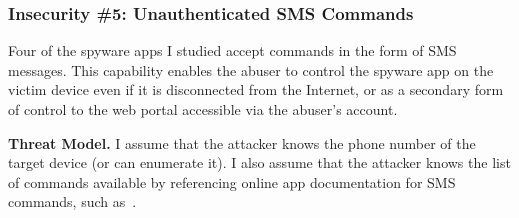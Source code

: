 



\subsubsection*{Insecurity \#5: Unauthenticated SMS Commands}

Four of the spyware apps I studied accept commands in
the form of SMS messages.  This capability enables the abuser to
control the spyware app on the victim device even if it is
disconnected from the Internet, or as a secondary form of control to
the web portal accessible via the abuser's account.

\textbf{Threat Model.} I assume that the attacker knows the phone
number of the target device (or can enumerate it). I also assume that
the attacker knows the list of commands available by referencing online
app documentation for SMS commands, such as~\cite{SpappSMSCommands:online,
  FlexispySMSCommands:online}.

